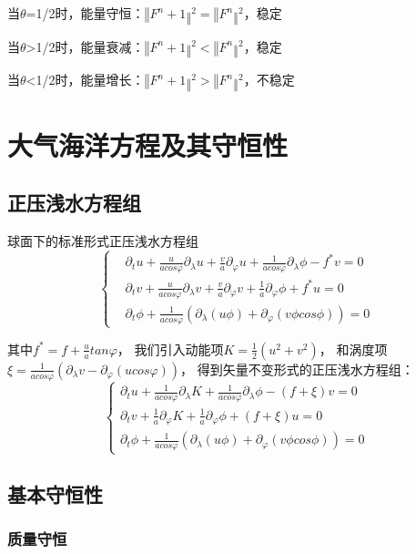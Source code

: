 \documentclass{article}
\begin{document}
当$\theta$=1/2时，能量守恒：$‖F^n+1‖^2=‖F^n‖^2$，稳定

当$\theta$>1/2时，能量衰减：$‖F^n+1‖^2<‖F^n‖^2$，稳定

当$\theta$<1/2时，能量增长：$‖F^n+1‖^2>‖F^n‖^2$，不稳定

\newpage

\section{大气海洋方程及其守恒性}
\subsection{正压浅水方程组}
球面下的标准形式正压浅水方程组
$$\begin{cases}
&{\partial_{t}u + \frac{u}{acos\varphi}\partial_{\lambda}u + \frac{v}{a}\partial_{\varphi}u + \frac{1}{acos\varphi}\partial_{\lambda}\phi - f^{*}v = 0} \\
&{\partial_{t}v + \frac{u}{acos\varphi}\partial_{\lambda}v + \frac{v}{a}\partial_{\varphi}v + \frac{1}{a}\partial_{\varphi}\phi + f^{*}u = 0} \\
&{\partial_{t}\phi + \frac{1}{acos\varphi}\left( {\partial_{\lambda}\left( {u\phi} \right) + \partial_{\varphi}\left( {v\phi cos\phi} \right)} \right) = 0}
\end{cases} $$

其中$f^{*} = f + \frac{u}{a}tan\varphi$，
我们引入动能项$K = \frac{1}{2}\left( u^{2} + v^{2} \right)$，
和涡度项$\xi = \frac{1}{acos\varphi}\left( {\partial_{\lambda}v - \partial_{\varphi}\left( {ucos\varphi} \right)} \right)$，
得到矢量不变形式的正压浅水方程组：
$$\begin{cases}
{\partial_{t}u + \frac{1}{acos\varphi}\partial_{\lambda}K + \frac{1}{acos\varphi}\partial_{\lambda}\phi - \left( {f + \xi} \right)v= 0} \\
{\partial_{t}v + \frac{1}{a}\partial_{\varphi}K + \frac{1}{a}\partial_{\varphi}\phi + \left( {f + \xi} \right)u = 0} \\
{\partial_{t}\phi + \frac{1}{acos\varphi}\left( {\partial_{\lambda}\left( {u\phi} \right) + \partial_{\varphi}\left( {v\phi cos\phi} \right)} \right)= 0}
\end{cases}$$

\subsection{基本守恒性}
\subsubsection{质量守恒}
\end{document}
